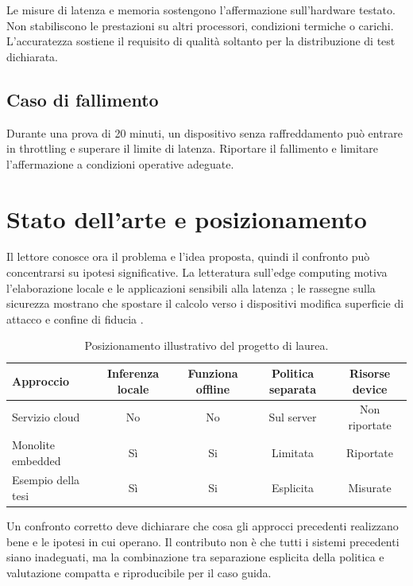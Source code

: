 \begin{keypoint}
Le misure di latenza e memoria sostengono l'affermazione sull'hardware testato. Non stabiliscono le prestazioni su altri processori, condizioni termiche o carichi. L'accuratezza sostiene il requisito di qualità soltanto per la distribuzione di test dichiarata.
\end{keypoint}

\section{Caso di fallimento}
Durante una prova di 20 minuti, un dispositivo senza raffreddamento può entrare in throttling e superare il limite di latenza. Riportare il fallimento e limitare l'affermazione a condizioni operative adeguate.

\chapter{Stato dell'arte e posizionamento}\label{ch:b-related}
Il lettore conosce ora il problema e l'idea proposta, quindi il confronto può concentrarsi su ipotesi significative. La letteratura sull'edge computing motiva l'elaborazione locale e le applicazioni sensibili alla latenza \cite{shi2016edge}; le rassegne sulla sicurezza mostrano che spostare il calcolo verso i dispositivi modifica superficie di attacco e confine di fiducia \cite{roman2018mobile}.

\begin{table}[htbp]
\centering
\caption{Posizionamento illustrativo del progetto di laurea.}
\label{tab:b-related}
\begin{tabularx}{\textwidth}{Ycccc}
\toprule
Approccio & Inferenza locale & Funziona offline & Politica separata & Risorse device\\
\midrule
Servizio cloud & No & No & Sul server & Non riportate\\
Monolite embedded & Sì & Si & Limitata & Riportate\\
Esempio della tesi & Sì & Si & Esplicita & Misurate\\
\bottomrule
\end{tabularx}
\end{table}

Un confronto corretto deve dichiarare che cosa gli approcci precedenti realizzano bene e le ipotesi in cui operano. Il contributo non è che tutti i sistemi precedenti siano inadeguati, ma la combinazione tra separazione esplicita della politica e valutazione compatta e riproducibile per il caso guida.

